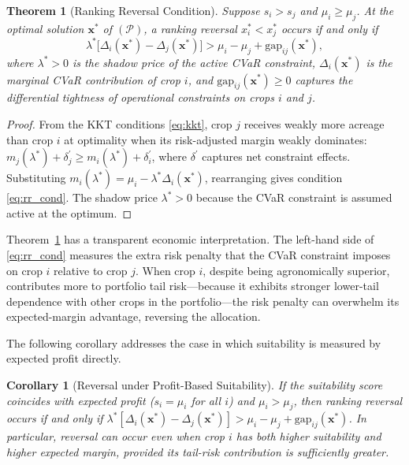 \documentclass[12pt,review,authoryear]{elsarticle}
\numberwithin{equation}{section}
\newtheorem{theorem}{Theorem}[section]
\newtheorem{corollary}{Corollary}[section]
\begin{document}
\begin{theorem}[Ranking Reversal Condition]
\label{thm:rr}
Suppose $s_i > s_j$ and $\mu_i \geq \mu_j$.  At the optimal solution
$\mathbf{x}^*$ of $(\mathcal{P})$, a ranking reversal $x_i^* < x_j^*$
occurs if and only if
\begin{equation}
\lambda^* \bigl[\Delta_i(\mathbf{x}^*) - \Delta_j(\mathbf{x}^*)\bigr]
> \mu_i - \mu_j + \text{gap}_{ij}(\mathbf{x}^*),
\label{eq:rr_cond}
\end{equation}
where $\lambda^* > 0$ is the shadow price of the active CVaR constraint,
$\Delta_i(\mathbf{x}^*)$ is the marginal CVaR contribution of crop $i$,
and $\text{gap}_{ij}(\mathbf{x}^*) \geq 0$ captures the differential
tightness of operational constraints on crops $i$ and $j$.
\end{theorem}

\begin{proof}
From the KKT conditions \eqref{eq:kkt}, crop $j$ receives weakly more
acreage than crop $i$ at optimality when its risk-adjusted margin
weakly dominates: $m_j(\lambda^*) + \delta_j^{\prime} \geq m_i(\lambda^*)
+ \delta_i^{\prime}$, where $\delta^{\prime}$ captures net constraint effects.
Substituting $m_i(\lambda^*) = \mu_i - \lambda^* \Delta_i(\mathbf{x}^*)$,
rearranging gives condition \eqref{eq:rr_cond}.  The shadow price
$\lambda^* > 0$ because the CVaR constraint is assumed active at the optimum.
\end{proof}

Theorem~\ref{thm:rr} has a transparent economic interpretation.  The
left-hand side of \eqref{eq:rr_cond} measures the extra risk penalty
that the CVaR constraint imposes on crop $i$ relative to crop $j$.  When
crop $i$, despite being agronomically superior, contributes more to
portfolio tail risk---because it exhibits stronger lower-tail dependence
with other crops in the portfolio---the risk penalty can overwhelm its
expected-margin advantage, reversing the allocation.

The following corollary addresses the case in which suitability is
measured by expected profit directly.

\begin{corollary}[Reversal under Profit-Based Suitability]
\label{cor:profit_suit}
If the suitability score coincides with expected profit ($s_i = \mu_i$
for all $i$) and $\mu_i > \mu_j$, then ranking reversal occurs if and
only if $\lambda^* [\Delta_i(\mathbf{x}^*) - \Delta_j(\mathbf{x}^*)] >
\mu_i - \mu_j + \text{gap}_{ij}(\mathbf{x}^*)$.  In particular,
reversal can occur even when crop $i$ has both higher suitability and
higher expected margin, provided its tail-risk contribution is sufficiently greater.
\end{corollary}
\end{document}
